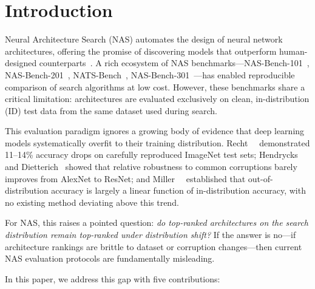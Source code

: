 \section{Introduction}
\label{sec:intro}

Neural Architecture Search (NAS) automates the design of neural network architectures, offering the promise of discovering models that outperform human-designed counterparts~\cite{liu2019darts,pham2018enas}.
A rich ecosystem of NAS benchmarks---NAS-Bench-101~\cite{ying2019nasbench101}, NAS-Bench-201~\cite{dong2020nasbench201}, NATS-Bench~\cite{dong2021natsbench}, NAS-Bench-301~\cite{zela2022nasbench301}---has enabled reproducible comparison of search algorithms at low cost.
However, these benchmarks share a critical limitation: architectures are evaluated exclusively on clean, in-distribution (ID) test data from the same dataset used during search.

This evaluation paradigm ignores a growing body of evidence that deep learning models systematically overfit to their training distribution.
Recht~\etal~\cite{recht2019imagenet} demonstrated 11--14\% accuracy drops on carefully reproduced ImageNet test sets; Hendrycks and Dietterich~\cite{hendrycks2019benchmarking} showed that relative robustness to common corruptions barely improves from AlexNet to ResNet; and Miller~\etal~\cite{miller2021accuracy} established that out-of-distribution accuracy is largely a linear function of in-distribution accuracy, with no existing method deviating above this trend.

For NAS, this raises a pointed question: \emph{do top-ranked architectures on the search distribution remain top-ranked under distribution shift?}
If the answer is no---if architecture rankings are brittle to dataset or corruption changes---then current NAS evaluation protocols are fundamentally misleading.

In this paper, we address this gap with five contributions:

